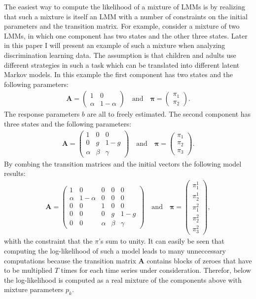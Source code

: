 \documentclass[a4paper,12pt,doc]{apaIngmar} %
\newcommand{\mat}{\mathbf}
\begin{document}
The easiest way to compute the likelihood of a mixture of LMMs is by
realizing that such a mixture is itself an LMM with a number of
constraints on the initial parameters and the transition matrix.  For
example, consider a mixture of two LMMs, in which one component has
two states and the other three states.  Later in this paper I will
present an example of such a mixture when analyzing discrimination
learning data.  The assumption is that children and adults use
different strategies in such a task which can be translated into
different latent Markov models.  In this example the first component
has two states and the following parameters:
\begin{gather*}
\mat{A} =\begin{pmatrix} 
1 & 0\\ \alpha & 1-\alpha
\end{pmatrix} \quad \text{and} \quad
\pmb{\pi}=\begin{pmatrix} \pi_{1}\\ \pi_{2} \end{pmatrix}.
\end{gather*}
The response parameters $b$ are all to freely estimated. The second 
component has three  states and the following parameters:
\begin{gather*}
\mat{A} =\begin{pmatrix} 
1 & 0 & 0\\ 0 & g & 1-g \\ \alpha & \beta & \gamma
\end{pmatrix} \quad \text{and} \quad
\pmb{\pi}=\begin{pmatrix} \pi_{1}\\\pi_{2}\\\pi_{3}  \end{pmatrix}.
\end{gather*}
By combing the transition matrices and the initial vectors the 
following model results:
\begin{gather*}
\mat{A} =\begin{pmatrix} 
1 & 0 & 0 & 0 & 0\\
\alpha & 1-\alpha & 0 & 0 & 0 \\
0 & 0 & 1 & 0 & 0
\\0 & 0 & 0 & g & 1-g 
\\ 0 & 0 & \alpha & \beta & \gamma
\end{pmatrix} \quad \text{and} \quad
\pmb{\pi}=\begin{pmatrix} \pi_{1}^{1}\\ \pi_{2}^{1}  \\ 
\pi_{1}^{2}\\\pi_{2}^{2}\\\pi_{3}^{2} \end{pmatrix},
\end{gather*}
whith the constraint that the $\pi$'s sum to unity.  It can easily be
seen that computing the log-likelihood of such a model leads to many
unneccessary computations because the transition matrix $\mat{A}$
contains blocks of zeroes that have to be multiplied $T$ times for
each time series under consideration.  Therefor, below the
log-likelihood is computed as a real mixture of the components above
with mixture parameters $p_{k}$.
\end{document}
